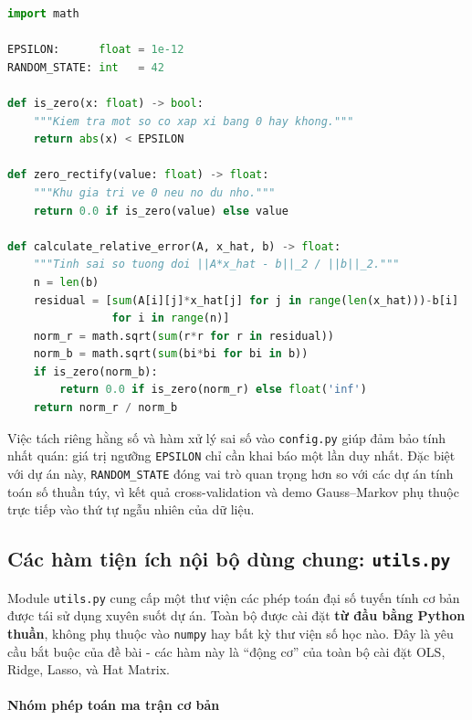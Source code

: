 \begin{lstlisting}[language=Python, caption={Module \texttt{config.py} - hằng số và hàm xử lý sai số dùng chung}]
import math

EPSILON:      float = 1e-12
RANDOM_STATE: int   = 42

def is_zero(x: float) -> bool:
    """Kiem tra mot so co xap xi bang 0 hay khong."""
    return abs(x) < EPSILON

def zero_rectify(value: float) -> float:
    """Khu gia tri ve 0 neu no du nho."""
    return 0.0 if is_zero(value) else value

def calculate_relative_error(A, x_hat, b) -> float:
    """Tinh sai so tuong doi ||A*x_hat - b||_2 / ||b||_2."""
    n = len(b)
    residual = [sum(A[i][j]*x_hat[j] for j in range(len(x_hat)))-b[i]
                for i in range(n)]
    norm_r = math.sqrt(sum(r*r for r in residual))
    norm_b = math.sqrt(sum(bi*bi for bi in b))
    if is_zero(norm_b):
        return 0.0 if is_zero(norm_r) else float('inf')
    return norm_r / norm_b
\end{lstlisting}

Việc tách riêng hằng số và hàm xử lý sai số vào \texttt{config.py} giúp đảm bảo tính nhất quán: giá trị ngưỡng \texttt{EPSILON} chỉ cần khai báo một lần duy nhất. Đặc biệt với dự án này, \texttt{RANDOM\_STATE} đóng vai trò quan trọng hơn so với các dự án tính toán số thuần túy, vì kết quả cross-validation và demo Gauss--Markov phụ thuộc trực tiếp vào thứ tự ngẫu nhiên của dữ liệu.


\subsection{Các hàm tiện ích nội bộ dùng chung: \texttt{utils.py}}

Module \texttt{utils.py} cung cấp một thư viện các phép toán đại số tuyến tính cơ bản được tái sử dụng xuyên suốt dự án. Toàn bộ được cài đặt \textbf{từ đầu bằng Python thuần}, không phụ thuộc vào \texttt{numpy} hay bất kỳ thư viện số học nào. Đây là yêu cầu bắt buộc của đề bài - các hàm này là ``động cơ'' của toàn bộ cài đặt OLS, Ridge, Lasso, và Hat Matrix.

\paragraph{Nhóm phép toán ma trận cơ bản}

